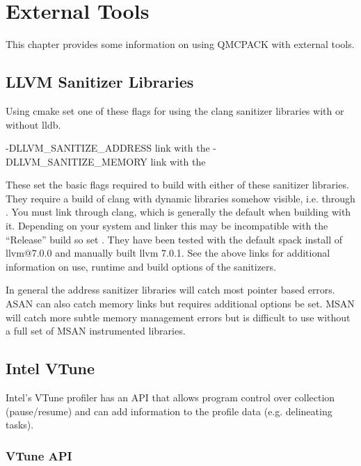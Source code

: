 \chapter{External Tools}
\label{chap:external_tools}
This chapter provides some information on using QMCPACK with external tools.

\section{LLVM Sanitizer Libraries}\label{tool:LLVM-Sanitizer-Libraries}

Using cmake set one of these flags for using the clang sanitizer libraries with or without lldb.

\begin{shade}
-DLLVM_SANITIZE_ADDRESS    link with the %
-DLLVM_SANITIZE_MEMORY     link with the %
\end{shade}

These set the basic flags required to build with either of these sanitizer libraries. They require a build of clang with dynamic libraries somehow visible, i.e. through . You must link through clang, which is generally the default when building with it. Depending on your system and linker this may be incompatible with the ``Release'' build so set . They have been tested with the default spack install of llvm@7.0.0 and manually built llvm 7.0.1. See the above links for additional information on use, runtime and build options of the sanitizers.

In general the address sanitizer libraries will catch most pointer based errors. ASAN can also catch memory links but requires additional options be set. MSAN will catch more subtle memory management errors but is difficult to use without a full set of MSAN instrumented libraries.

\section{Intel VTune}

Intel's VTune profiler has an API that allows program control over collection (pause/resume) and can add information to the profile data (e.g. delineating tasks).

\subsection{VTune API}

